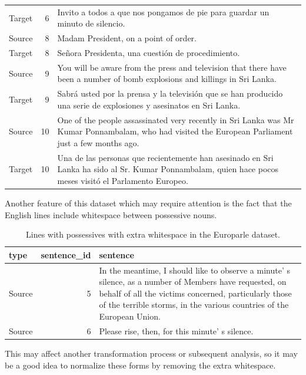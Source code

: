 \documentclass[
]{article}
\begin{document}
\begin{table}
\begin{tabular}[t]{lrl}
Target & 6 & Invito a todos a que nos pongamos de pie para guardar un minuto de silencio.\\
\addlinespace
Source & 8 & Madam President, on a point of order.\\
Target & 8 & Señora Presidenta, una cuestión de procedimiento.\\
Source & 9 & You will be aware from the press and television that there have been a number of bomb explosions and killings in Sri Lanka.\\
Target & 9 & Sabrá usted por la prensa y la televisión que se han producido una serie de explosiones y asesinatos en Sri Lanka.\\
Source & 10 & One of the people assassinated very recently in Sri Lanka was Mr Kumar Ponnambalam, who had visited the European Parliament just a few months ago.\\
\addlinespace
Target & 10 & Una de las personas que recientemente han asesinado en Sri Lanka ha sido al Sr. Kumar Ponnambalam, quien hace pocos meses visitó el Parlamento Europeo.\\
\bottomrule
\end{tabular}
\end{table}

Another feature of this dataset which may require attention is the fact that the English lines include whitespace between possessive nouns.

\begin{table}

\caption{\label{tab:normalize-whitespace-identify-europarle}Lines with possessives with extra whitespace in the Europarle dataset.}
\centering
\begin{tabular}[t]{lrl}
\toprule
type & sentence\_id & sentence\\
\midrule
Source & 5 & In the meantime, I should like to observe a minute' s silence, as a number of Members have requested, on behalf of all the victims concerned, particularly those of the terrible storms, in the various countries of the European Union.\\
Source & 6 & Please rise, then, for this minute' s silence.\\
\bottomrule
\end{tabular}
\end{table}

This may affect another transformation process or subsequent analysis, so it may be a good idea to normalize these forms by removing the extra whitespace.
\end{document}
